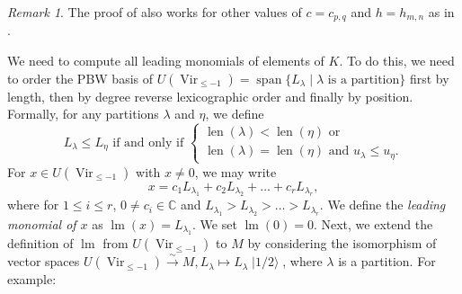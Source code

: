 \documentclass[a4paper, 12pt, reqno]{amsart}
\theoremstyle{remark}
\newtheorem{remark}[theorem]{Remark}
\DeclareMathOperator{\Vir}{Vir}
\DeclareMathOperator{\lm}{lm}
\DeclareMathOperator{\vspan}{span}
\DeclareMathOperator{\len}{len}
\DeclareMathOperator{\vachalf}{|1/2\rangle}
\begin{document}
\begin{remark}
  \label{rmk:47}
  The proof of  also works for other values of $c = c_{p, q}$ and $h = h_{m, n}$ as in .
\end{remark}

We need to compute all leading monomials of elements of $K$.
To do this, we need to order the PBW basis of $U(\Vir_{\le -1}) = \vspan\{L_{\lambda} \mid \text{$\lambda$ is a partition}\}$ first by length, then by degree reverse lexicographic order and finally by position.
Formally, for any partitions $\lambda$ and $\eta$, we define
\begin{equation*}
  L_{\lambda} \le L_{\eta}\text{ if and only if }
  \begin{cases}
    \len(\lambda) < \len(\eta)\text{ or } \\
    \len(\lambda) = \len(\eta)\text{ and }u_{\lambda} \le u_{\eta}.
  \end{cases}
\end{equation*}
For $x \in U(\Vir_{\le -1})$ with $x \neq 0$, we may write
\begin{equation*}
  x = c_1L_{\lambda_1} + c_2L_{\lambda_2} + \dots + c_rL_{\lambda_r},
\end{equation*}
where for $1 \le i \le r$, $0 \neq c_i \in \mathbb{C}$ and $L_{\lambda_1} > L_{\lambda_2} > \dots > L_{\lambda_r}$.
We define the \emph{leading monomial of $x$} as $\lm(x) = L_{\lambda_1}$.
We set $\lm(0) = 0$.
Next, we extend the definition of $\lm$ from $U(\Vir_{\le -1})$ to $M$ by considering the isomorphism of vector spaces $U(\Vir_{\le -1}) \xrightarrow{\sim} M, L_{\lambda} \mapsto L_{\lambda}\vachalf$, where $\lambda$ is a partition.
For example:
\end{document}
